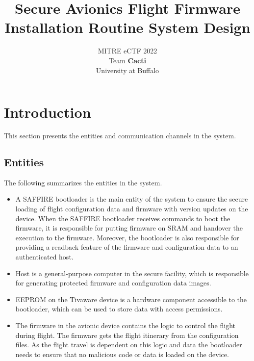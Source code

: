 \documentclass[11pt,oneside,onecolumn,letterpaper]{article}
\title{Secure Avionics Flight Firmware Installation Routine System Design}
\author{MITRE eCTF 2022\\Team \textbf{Cacti}\\ University at Buffalo}
\date{}
\begin{document}
\normalsize


\maketitle

\renewcommand{\thepage}{System Design, Team Cacti, University at Buffalo--\arabic{page}}
\setcounter{page}{1} \normalsize
%

\newcommand{\flagRollback}{\textsf{Rollback}\xspace}

\section{Introduction}

This section presents the entities and communication channels in the system.

\subsection{Entities}

The following summarizes the entities in the system.

\begin{itemize}
	\item A SAFFIRE bootloader is the main entity of the system to ensure the secure loading of flight configuration data and firmware with version updates on the device.
	When the SAFFIRE bootloader receives commands to boot the firmware, it is responsible for putting firmware on SRAM and handover the execution to the firmware. 
	Moreover, the bootloader is also responsible for providing a readback feature of the firmware and configuration data to an authenticated host.
	
	\item Host is a general-purpose computer in the secure facility, which is responsible for generating protected firmware and configuration data images.
	\item  EEPROM on the Tivaware device is a hardware component accessible to the bootloader, which can be used to store data with access permissions.
	\item The firmware in the avionic device contains the logic to control the flight during flight. 
	The firmware gets the flight itinerary from the configuration files.
	As the flight travel is dependent on this logic and data the bootloader needs to ensure that no malicious code or data is loaded on the device.
\end{itemize}
\end{document}
